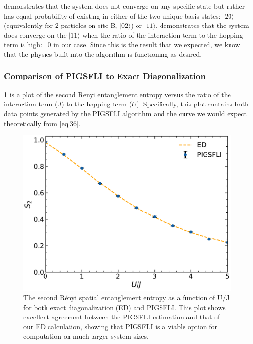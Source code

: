  demonstrates that the system does not converge on any specific state but rather has equal probability of existing in either of the two unique basis states: $|20\rangle$ (equivalently for $2$ particles on site B, $|02\rangle$) or $|11\rangle$.  demonstrates that the system does converge on the $|11\rangle$ when the ratio of the interaction term to the hopping term is high: $10$ in our case. Since this is the result that we expected, we know that the physics built into the algorithm is functioning as desired.

\subsubsection{Comparison of PIGSFLI to Exact Diagonalization} \label{results}

\cref*{fig:renyi_spatial} is a plot of the second Renyi entanglement entropy versus the ratio of the interaction term ($J$) to the hopping term ($U$). Specifically, this plot contains both data points generated by the PIGSFLI algorithm and the curve we would expect theoretically from \cref{eq:36}.

\begin{figure}[H]
\centering
\includegraphics[scale=0.5]{../figures/renyi_spatial.pdf}
\caption{The second Rényi spatial entanglement entropy as a function of U/J for both exact diagonalization (ED) and PIGSFLI. This plot shows excellent agreement between the PIGSFLI estimation and that of our ED calculation, showing that PIGSFLI is a viable option for computation on much larger system sizes.}
\label{fig:renyi_spatial}
\end{figure}

